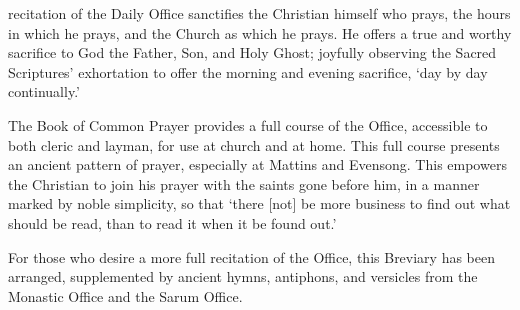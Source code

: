 {}
 recitation of the Daily Office sanctifies the Christian himself who prays, the hours in which he prays, and the Church as which he prays. He offers a true and worthy sacrifice to God the Father, Son, and Holy Ghost; joyfully observing the Sacred Scriptures' exhortation to offer the morning and evening sacrifice, `day by day continually.'

The Book of Common Prayer provides a full course of the Office, accessible to both cleric and layman, for use at church and at home. This full course presents an ancient pattern of prayer, especially at Mattins and Evensong. This empowers the Christian to join his prayer with the saints gone before him, in a manner marked by noble simplicity, so that `there [not] be more business to find out what should be read, than to read it when it be found out.'

For those who desire a more full recitation of the Office, this Breviary has been arranged, supplemented by ancient hymns, antiphons, and versicles from the Monastic Office and the Sarum Office.
